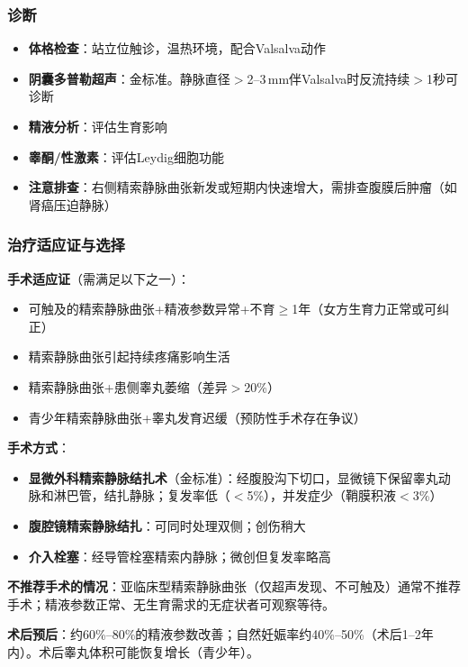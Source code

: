 \documentclass[12pt,a4paper,twoside]{ctexbook}
\begin{document}
\subsubsection{诊断}

\begin{itemize}[leftmargin=2cm]
	\item \textbf{体格检查}：站立位触诊，温热环境，配合Valsalva动作
	\item \textbf{阴囊多普勒超声}：金标准。静脉直径$>$2--3\,mm伴Valsalva时反流持续$>$1秒可诊断
	\item \textbf{精液分析}：评估生育影响
	\item \textbf{睾酮/性激素}：评估Leydig细胞功能
	\item \textbf{注意排查}：右侧精索静脉曲张新发或短期内快速增大，需排查腹膜后肿瘤（如肾癌压迫静脉）
\end{itemize}

\subsubsection{治疗适应证与选择}

\textbf{手术适应证}（需满足以下之一）：
\begin{itemize}[leftmargin=2cm]
	\item 可触及的精索静脉曲张+精液参数异常+不育$\ge$1年（女方生育力正常或可纠正）
	\item 精索静脉曲张引起持续疼痛影响生活
	\item 精索静脉曲张+患侧睾丸萎缩（差异$>$20\%）
	\item 青少年精索静脉曲张+睾丸发育迟缓（预防性手术存在争议）
\end{itemize}

\textbf{手术方式}：
\begin{itemize}[leftmargin=2cm]
	\item \textbf{显微外科精索静脉结扎术}（金标准）：经腹股沟下切口，显微镜下保留睾丸动脉和淋巴管，结扎静脉；复发率低（$<$5\%），并发症少（鞘膜积液$<$3\%）
	\item \textbf{腹腔镜精索静脉结扎}：可同时处理双侧；创伤稍大
	\item \textbf{介入栓塞}：经导管栓塞精索内静脉；微创但复发率略高
\end{itemize}

\textbf{不推荐手术的情况}：亚临床型精索静脉曲张（仅超声发现、不可触及）通常不推荐手术；精液参数正常、无生育需求的无症状者可观察等待。

\textbf{术后预后}：约60\%--80\%的精液参数改善；自然妊娠率约40\%--50\%（术后1--2年内）。术后睾丸体积可能恢复增长（青少年）。
\end{document}
